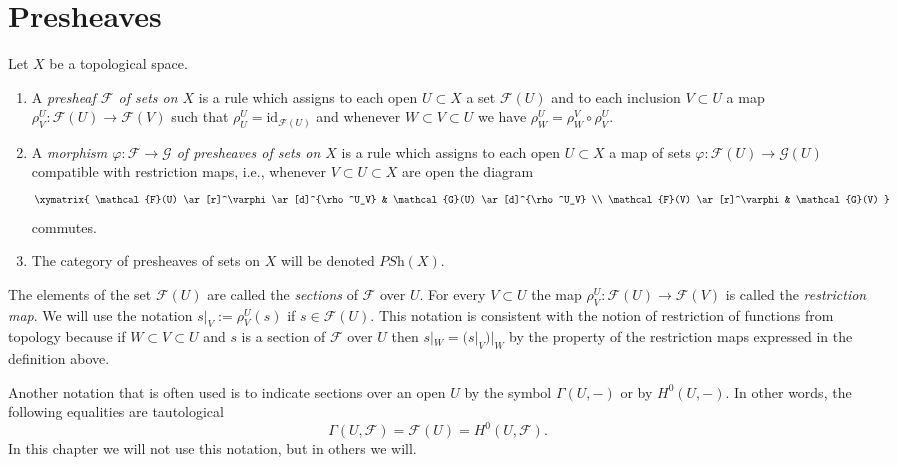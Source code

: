 \section{Presheaves}
\label{section-presheaves}


\begin{definition}
\label{definition-presheaf}
Let $X$ be a topological space.
\begin{enumerate}
\item A {\it presheaf $\mathcal{F}$ of sets on $X$} is a rule which
assigns to each open $U \subset X$ a set $\mathcal{F}(U)$ and
to each inclusion $V \subset U$ a map
$\rho^U_V : \mathcal{F}(U) \to \mathcal{F}(V)$ such that
$\rho^U_U = \text{id}_{\mathcal{F}(U)}$ and
whenever $W \subset V \subset U$ we have
$\rho^U_W = \rho^V_W \circ \rho ^U_V$.
\item A {\it morphism $\varphi : \mathcal{F} \to \mathcal{G}$
of presheaves of sets on $X$} is a rule which assigns to each
open $U \subset X$ a map of sets $\varphi : \mathcal{F}(U)
\to \mathcal{G}(U)$ compatible with restriction maps,
i.e., whenever $V \subset U \subset X$ are open the
diagram
$$
\xymatrix{
\mathcal{F}(U) \ar[r]^\varphi \ar[d]^{\rho^U_V} &
\mathcal{G}(U) \ar[d]^{\rho^U_V} \\
\mathcal{F}(V) \ar[r]^\varphi & \mathcal{G}(V)
}
$$
commutes.
\item The category of presheaves of sets on $X$ will be denoted
$\textit{PSh}(X)$.
\end{enumerate}
\end{definition}

\noindent
The elements of the set $\mathcal{F}(U)$ are called
the {\it sections} of $\mathcal{F}$ over $U$.
For every $V \subset U$ the map
$\rho^U_V : \mathcal{F}(U) \to \mathcal{F}(V)$
is called the {\it restriction map}. We will use the
notation $s|_V := \rho^U_V(s)$ if $s\in \mathcal{F}(U)$.
This notation is consistent with the notion of restriction
of functions from topology because if $W \subset V \subset U$
and $s$ is a section of $\mathcal{F}$ over $U$ then
$s|_W = (s|_V)|_W$ by the property of the restriction maps
expressed in the definition above.

\medskip\noindent
Another notation that is often used is to indicate sections
over an open $U$ by the symbol $\Gamma(U, -)$ or by
$H^0(U, -)$. In other words, the following equalities
are tautological
$$
\Gamma(U, \mathcal{F}) = \mathcal{F}(U) = H^0(U, \mathcal{F}).
$$
In this chapter we will not use this notation, but in others
we will.

